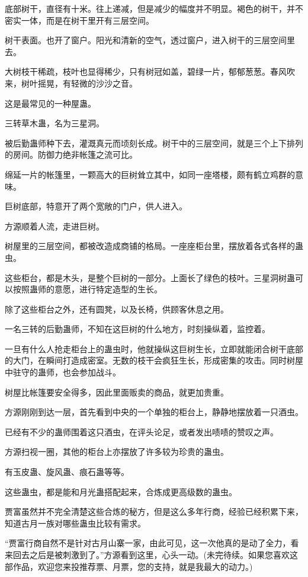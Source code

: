 \begin{this_body}
底部树干，直径有十米。往上递减，但是减少的幅度并不明显。褐色的树干，并不密实一体，而是在树干里开有三层空间。

树干表面。也开了窗户。阳光和清新的空气，透过窗户，进入树干的三层空间里去。

大树枝干稀疏，枝叶也显得稀少，只有树冠如盖，碧绿一片，郁郁葱葱。春风吹来，树叶摇晃，有轻微的沙沙之音。

这是最常见的一种屋蛊。

三转草木蛊，名为三星洞。

被后勤蛊师种下去，灌溉真元而顷刻长成。树干中的三层空间，就是三个上下排列的房间。防御力绝非帐篷之流可比。

绵延一片的帐篷里，一颗高大的巨树耸立其中，如同一座塔楼，颇有鹤立鸡群的意味。

巨树底部，特意开了两个宽敞的门户，供人进入。

方源顺着人流，走进巨树。

树屋里的三层空间，都被改造成商铺的格局。一座座柜台里，摆放着各式各样的蛊虫。

这些柜台，都是木头，是整个巨树的一部分。上面长了绿色的枝叶。三星洞树蛊可以按照蛊师的意愿，进行特定造型的生长。

除了这些柜台之外，还有圆凳，以及长椅，供顾客休息之用。

一名三转的后勤蛊师，不知在这巨树的什么地方，时刻操纵着，监控着。

一旦有什么人抢走柜台上的蛊虫时，他就操纵这巨树生长，立即就能闭合树干底部的大门，在瞬间打造成密室。无数的枝干会疯狂生长，形成密集的攻击。同时树屋中驻守的蛊师，也会参加战斗。

树屋比帐篷要安全得多，因此里面贩卖的商品，就更加贵重。

方源刚刚到达一层，首先看到中央的一个单独的柜台上，静静地摆放着一只酒虫。

已经有不少的蛊师围着这只酒虫，在评头论足，或者发出啧啧的赞叹之声。

方源扫视一圈，其他的柜台上亦摆放了许多较为珍贵的蛊虫。

有玉皮蛊、旋风蛊、痕石蛊等等。

这些蛊虫，都是能和月光蛊搭配起来，合炼成更高级数的蛊虫。

贾富虽然并不完全清楚这些合炼的秘方，但是这么多年行商，经验已经积累下来，知道古月一族对哪些蛊虫比较有需求。

“贾富行商自然不是针对古月山寨一家，由此可见，这一次他真的是动了全力，看来回去之后是被刺激到了。”方源看到这里，心头一动。(未完待续。如果您喜欢这部作品，欢迎您来投推荐票、月票，您的支持，就是我最大的动力。)

\end{this_body}

